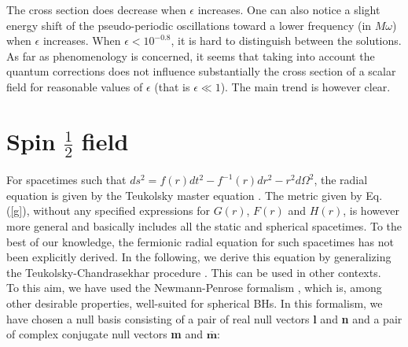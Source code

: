 \documentclass[twocolumn,amsmath,amssymb,prl,10pt,nofootinbib,superscriptaddress]{revtex4}
\begin{document}


The cross section does decrease when $\epsilon$ increases. One can also notice a slight energy shift of the pseudo-periodic oscillations toward a lower frequency (in $M\omega$) when  $\epsilon$ increases. When $\epsilon < 10^{-0.8}$, it is hard to distinguish between the solutions. As far as phenomenology is concerned, it seems that taking into account the quantum corrections does not influence substantially the cross section of a scalar field for reasonable values of $\epsilon$ (that is $\epsilon
\ll 1$). The main trend is however clear.



\section{Spin $\frac{1}{2}$ field }


For spacetimes such that $ds^2=f(r)dt^2-f^{-1}(r)dr^2-r^2 d \Omega ^2$,  the radial equation is given by the Teukolsky master equation \cite{Teukolsky:1973ha}. The metric given by Eq. (\ref{g}), without any specified expressions for $G(r)$, $F(r)$ and $H(r)$, is however more general and basically includes all the static and spherical spacetimes. To the best of our knowledge, the fermionic radial equation for such spacetimes has not been explicitly derived. In the following, we derive this equation by generalizing the Teukolsky-Chandrasekhar procedure \cite{Chandrasekhar:1985kt}. This can be used in other contexts. \\

To this aim, we have used the Newmann-Penrose formalism \cite{NewPen}, which is, among other desirable properties, well-suited for spherical BHs. In this formalism, we have chosen a null basis consisting of a pair of real null vectors \textbf{l} and \textbf{n} and a pair of complex conjugate null vectors \textbf{m} and $\overline{\textbf{m}}$:
\end{document}
